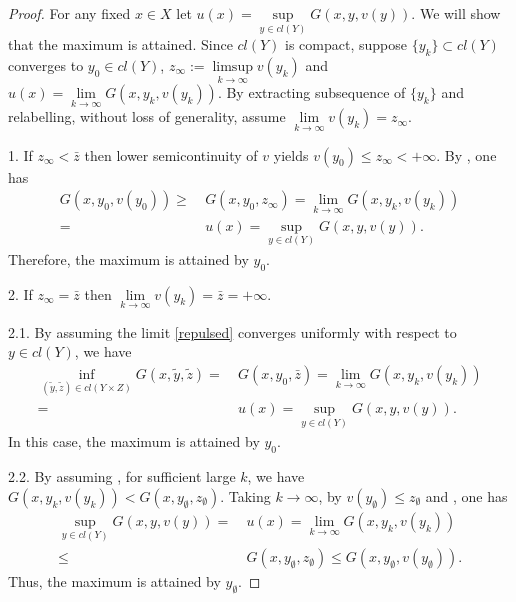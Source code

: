 								
\begin{proof}
	For any fixed $x \in X$ let $u(x) = \sup\limits_{y\in cl(Y)} G(x,y,v(y))$. We will show that the maximum is attained. Since $cl(Y)$ is compact, suppose $\{y_{k}\}\subset cl(Y)$ converges to $y_0 \in cl(Y)$,
	$z_\infty:= \limsup\limits_{k \to \infty} v(y_k)$ and $u(x) = \lim\limits_{k\to \infty} G(x, y_k,  v(y_k))$. By extracting subsequence of $\{y_k\}$ and relabelling, without loss of generality, assume $\lim\limits_{k\to \infty} v(y_k) = z_{\infty}$. 
								
	1.  If $z_{\infty}< \bar{z}$ then lower semicontinuity of $v$ yields $v(y_0)\le z_{\infty} < +\infty$. By \Gfour, one has
		\begin{equation}
		\begin{split}
			G(x, y_0, v(y_0)) \ge & ~G(x, y_0, z_{\infty}) = \lim\limits_{k\to \infty} G(x, y_k,  v(y_k))\\
			= & ~u(x) = \sup\limits_{y\in cl(Y)} G(x,y,v(y)).
		\end{split}
		\end{equation}
	Therefore, the maximum is attained by $y_0$.\medskip
									
	2. If $z_{\infty} = \bar{z}$ then $\lim\limits_{k\to \infty} v(y_k) = \bar{z} = + \infty$.
									
		2.1. By assuming the limit \eqref{repulsed} converges uniformly with respect to  $y \in cl(Y)$, we have 
			\begin{equation*}
			\begin{split}
				\inf_{(\tilde{y}, \tilde{z})\in cl(Y\times Z)} G(x, \tilde{y}, \tilde{z}) = &~ G(x,y_0,\bar{z}) = \lim_{k \to \infty} G(x,y_k, v(y_k)) \\
				=&~ u(x) = \sup \limits_{y\in cl(Y)} G(x,y,v(y)).
			\end{split}
			\end{equation*}
		In this case, the maximum is attained by $y_0$. 
									
		2.2. By assuming \Gfive, for sufficient large $k$, we have $G(x, y_k, v(y_k)) < G(x, y_{\emptyset}, z_{\emptyset})$. Taking $k \to \infty$, by $v(y_{\emptyset}) \le z_{\emptyset}$  and \Gfour, one has
			\begin{equation*}
			\begin{split}
				\sup\limits_{y\in cl(Y)} G(x,y,v(y)) = &~u(x) = \lim_{k \to \infty} G(x,y_k, v(y_k)) \\
				\le &~ G(x, y_{\emptyset}, z_{\emptyset}) \le G(x, y_{\emptyset}, v(y_{\emptyset})).
			\end{split}
			\end{equation*}
	Thus, the maximum is attained by $y_{\emptyset}$.
\end{proof}
									
